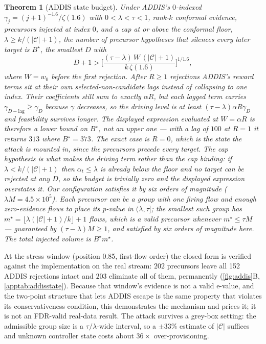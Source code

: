 \documentclass[conference]{IEEEtran}
\newtheorem{theorem}{Theorem}
\newcommand{\Cal}{\mathcal{C}}
\newcommand{\nCal}{\lvert\Cal\rvert}
\newcommand{\ceil}{M}
\newcommand{\alphat}{\alpha_t}
\begin{document}
\begin{theorem}[ADDIS state budget]\label{thm:addis}
Under ADDIS's $0$-indexed $\gamma_j=(j+1)^{-1.6}/\zeta(1.6)$ with $0<\lambda<\tau<1$, rank-$k$
conformal evidence, precursors injected at index $0$, and a cap at or above the conformal floor,
$\lambda\ge k/(\nCal+1)$, the number of precursor hypotheses that silences every later target is
$B^{\star}$, the smallest $D$ with
\[
D+1>\Big[\frac{(\tau-\lambda)\,W\,(\nCal+1)}{k\,\zeta(1.6)}\Big]^{1/1.6},
\]
where $W=w_0$ before the first rejection. After $R\ge1$ rejections ADDIS's reward terms sit at their own
selected-non-candidate lags instead of collapsing to one index. Their coefficients still sum to exactly
$\alpha R$, but each lagged term carries $\gamma_{D-\text{lag}}\ge\gamma_D$ because $\gamma$ decreases, so
the driving level is at least $(\tau-\lambda)\alpha R\gamma_D$ and feasibility survives \emph{longer}.
The displayed expression evaluated at $W=\alpha R$ is therefore a \emph{lower} bound on $B^{\star}$, not
an upper one --- with a lag of $100$ at $R=1$ it returns $313$ where $B^{\star}=373$. The exact case is
$R=0$, which is the state the attack is mounted in, since the precursors precede every target. The cap hypothesis is what makes
the driving term rather than the cap binding: if $\lambda<k/(\nCal+1)$ then $\alphat\le\lambda$ is
already below the floor and no target can be rejected at any $D$, so the budget is trivially zero and
the displayed expression overstates it. Our configuration satisfies it by six orders of magnitude
($\lambda\ceil=4.5\times10^{5}$). Each precursor can be a group
with one firing flow and enough zero-evidence flows to place its p-value in $(\lambda,\tau]$; the smallest
such group has $m^{\star}=\lfloor\lambda(\nCal+1)/k\rfloor+1$ flows, which is a valid precursor whenever
$m^{\star}\le\tau\ceil$ --- guaranteed by $(\tau-\lambda)\ceil\ge1$, and satisfied by six orders of
magnitude here. The total injected volume is $B^{\star}m^{\star}$.
\end{theorem}

At the stress window (position 0.85, first-flow order) the closed form is verified against the
implementation on the real stream: $202$ precursors leave all 152 ADDIS rejections intact and $203$
eliminate all of them, permanently (\cref{fig:addis}B, \cref{apptab:addisstate}). Because
that window's evidence is not a valid e-value, and the two-point structure that lets ADDIS escape is the
same property that violates its conservativeness condition, this demonstrates the mechanism and prices
it; it is not an FDR-valid real-data result. The attack survives a grey-box setting: the admissible group
size is a $\tau/\lambda$-wide interval, so a $\pm33\%$ estimate of $\nCal$ suffices and unknown controller
state costs about $36\times$ over-provisioning.
\end{document}
